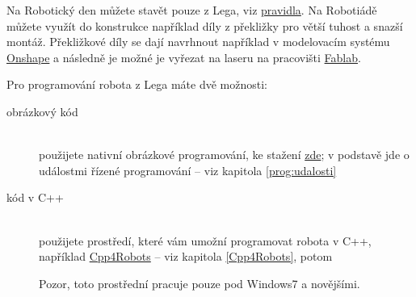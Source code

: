 Na Robotický den můžete stavět pouze z  Lega, viz  \href{http://robotickyden.cz/2018/rules/2018-Construction_Kits-parts.php}{pravidla}. 
Na Robotiádě můžete využít do konstrukce například díly z překližky  pro větší tuhost a snazší montáž. 
Překližkové díly se dají navrhnout například v modelovacím systému \href{https://www.onshape.com/}{Onshape}  a následně je možné je vyřezat na laseru na pracovišti \href{https://www.fablabbrno.cz}{Fablab}.

Pro programování robota z Lega máte dvě možnosti: 

\begin{description}
	\item[obrázkový kód]~\\
		použijete nativní obrázkové programování, ke stažení \href{https://www.lego.com/en-us/mindstorms/downloads}{zde};
		v podstavě jde o událostmi řízené programování -- viz kapitola \ref{prog:udalosti}
	\item[kód v C++]~\\
		použijete prostředí, které vám umožní programovat robota v C++, například \href{http://www.cpp4robots.cz/}{Cpp4Robots}
		-- viz kapitola \ref{Cpp4Robots}, potom %

		Pozor, toto prostřední pracuje pouze pod Windows7 a novějšími.
		
\end{description}



